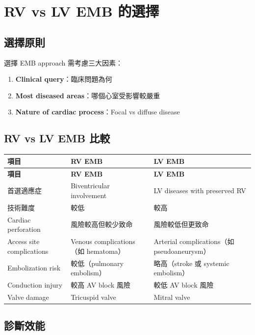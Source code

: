 \documentclass[12pt,a4paper]{article}
\begin{document}
\section{RV vs LV EMB 的選擇}

\subsection{選擇原則}

選擇 EMB approach 需考慮三大因素：
\begin{enumerate}
    \item \textbf{Clinical query}：臨床問題為何
    \item \textbf{Most diseased areas}：哪個心室受影響較嚴重
    \item \textbf{Nature of cardiac process}：Focal vs diffuse disease
\end{enumerate}

\subsection{RV vs LV EMB 比較}

\begin{longtable}{p{4cm}p{5cm}p{5cm}}
\toprule
\textbf{項目} & \textbf{RV EMB} & \textbf{LV EMB} \\
\midrule
\endfirsthead
\toprule
\textbf{項目} & \textbf{RV EMB} & \textbf{LV EMB} \\
\midrule
\endhead
首選適應症 & Biventricular involvement & LV diseases with preserved RV \\
\midrule
技術難度 & 較低 & 較高 \\
\midrule
Cardiac perforation & 風險較高但較少致命 & 風險較低但更致命 \\
\midrule
Access site complications & Venous complications（如 hematoma） & Arterial complications（如 pseudoaneurysm） \\
\midrule
Embolization risk & 較低（pulmonary embolism） & 略高（stroke 或 systemic embolism） \\
\midrule
Conduction injury & 較高 AV block 風險 & 較低 AV block 風險 \\
\midrule
Valve damage & Tricuspid valve & Mitral valve \\
\bottomrule
\end{longtable}

\subsection{診斷效能}
\end{document}
